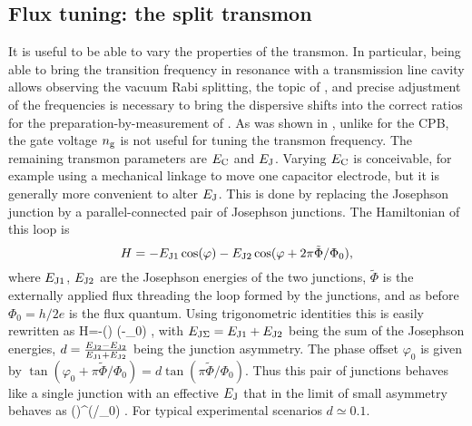 \subsection{Flux tuning: the split transmon}
\label{sec:fluxtuning}
It is useful to be able to vary  the properties of the transmon. In particular, being able to bring the transition frequency in resonance with a transmission line cavity allows observing the vacuum Rabi splitting, the topic of , and precise adjustment of the frequencies is necessary to bring the dispersive shifts into the correct ratios for the preparation-by-measurement of . As was shown in , unlike for the CPB, the gate voltage $n_{\text{g}}$ is not useful for tuning the transmon frequency. The remaining transmon parameters are $E_{\text{C}}$ and $E_{\text{J}}$. Varying $E_{\text{C}}$ is conceivable, for example using a mechanical linkage to move one capacitor electrode, but it is generally more convenient to alter $E_{\text{J}}$. This is done by replacing the Josephson junction by a parallel-connected pair of Josephson junctions. The Hamiltonian of this loop is
\begin{equation}
    \label{eq:squid}
    H=-E_{\text{J}1}\cos({\varphi})-E_{\text{J}2}\cos({\varphi}+2\pi\tilde\Phi/\Phi_0),
\end{equation}
where $E_{\text{J}1}$, $E_{\text{J}2}$ are the Josephson energies of the two junctions, $\tilde\Phi$ is the externally applied flux threading the loop formed by the junctions, and as before $\Phi_0=h/2e$ is the flux quantum. Using trigonometric identities this is easily rewritten as
\be
    \label{eq:squid2}
   H=-\ej\Sigma\cos\biggl(\biggr)
        \cos(\vph-\varphi_0) ,
\ee
with $E_{\text{J}\Sigma}=E_{\text{J}1}+E_{\text{J}2}$ being the sum of the Josephson energies, $d=\frac{E_{\text{J}2}-E_{\text{J}2}}{E_{\text{J}1}+E_{\text{J}2}}$ being the junction asymmetry. The phase offset $\varphi_0$ is given by $\tan(\varphi_0+\pi\tilde\Phi/\Phi_0)=d\tan(\pi\tilde\Phi/\Phi_0)$. Thus this pair of junctions behaves like a single junction with an effective $E_{\text{J}}$ that in the limit of small asymmetry behaves as
\be
\label{eq:EJeff}
    \EJ(\tPhi)\simeq\EJ^\cos(\pi\tPhi/\Phi_0) .
\ee%
%
For typical experimental scenarios $d\simeq0.1$.

